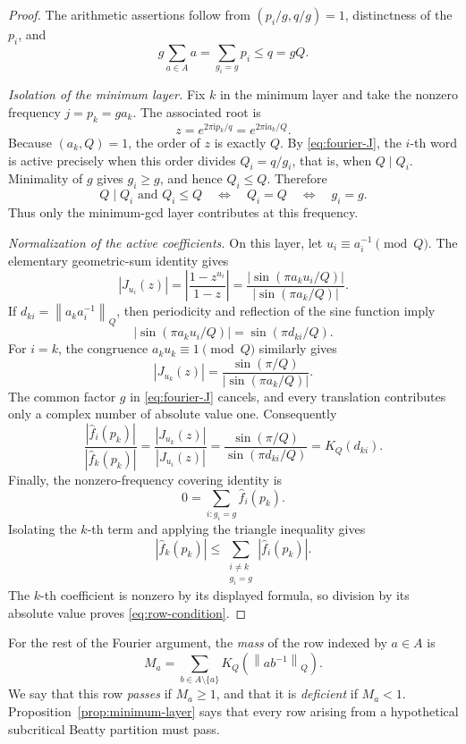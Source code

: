 \documentclass[11pt]{article}
\theoremstyle{definition}
\theoremstyle{remark}
\newcommand{\normQ}[1]{\left\lVert #1\right\rVert_Q}
\newcommand{\ii}{\mathrm i}
\begin{document}
\begin{proof}
The arithmetic assertions follow from
\((p_i/g,q/g)=1\), distinctness of the \(p_i\), and
\[
 g\sum_{a\in A}a=\sum_{g_i=g}p_i\le q=gQ.
\]

\smallskip
\noindent\emph{Isolation of the minimum layer.}
Fix \(k\) in the minimum layer and take the nonzero frequency
\(j=p_k=ga_k\).  The associated root is
\[
 z=e^{2\pi\ii p_k/q}=e^{2\pi\ii a_k/Q}.
\]
Because \((a_k,Q)=1\), the order of \(z\) is exactly \(Q\).  By
\eqref{eq:fourier-J}, the \(i\)-th word is active precisely when this order
divides \(Q_i=q/g_i\), that is, when \(Q\mid Q_i\).  Minimality of \(g\)
gives \(g_i\ge g\), and hence \(Q_i\le Q\).  Therefore
\[
 Q\mid Q_i\text{ and }Q_i\le Q
 \quad\Longleftrightarrow\quad Q_i=Q
 \quad\Longleftrightarrow\quad g_i=g.
\]
Thus only the minimum-gcd layer contributes at this frequency.

\smallskip
\noindent\emph{Normalization of the active coefficients.}
On this layer, let \(u_i\equiv a_i^{-1}\pmod Q\).  The elementary
geometric-sum identity gives
\[
|J_{u_i}(z)|
=\left|\frac{1-z^{u_i}}{1-z}\right|
=\frac{|\sin(\pi a_k u_i/Q)|}{|\sin(\pi a_k/Q)|}.
\]
If \(d_{ki}=\normQ{a_ka_i^{-1}}\), then periodicity and reflection of
the sine function imply
\[
 |\sin(\pi a_ku_i/Q)|=\sin(\pi d_{ki}/Q).
\]
For \(i=k\), the congruence \(a_ku_k\equiv1\pmod Q\) similarly gives
\[
 |J_{u_k}(z)|
 =\frac{\sin(\pi/Q)}{|\sin(\pi a_k/Q)|}.
\]
The common factor \(g\) in \eqref{eq:fourier-J} cancels, and every
translation contributes only a complex number of absolute value one.
Consequently
\[
 \frac{|\widehat f_i(p_k)|}{|\widehat f_k(p_k)|}
 =\frac{|J_{u_k}(z)|}{|J_{u_i}(z)|}
 =\frac{\sin(\pi/Q)}{\sin(\pi d_{ki}/Q)}
 =K_Q(d_{ki}).
\]
Finally, the nonzero-frequency covering identity is
\[
 0=\sum_{i:g_i=g}\widehat f_i(p_k).
\]
Isolating the \(k\)-th term and applying the triangle inequality gives
\[
 |\widehat f_k(p_k)|
 \le\sum_{\substack{i\ne k\\g_i=g}}|\widehat f_i(p_k)|.
\]
The \(k\)-th coefficient is nonzero by its displayed formula, so division
by its absolute value proves \eqref{eq:row-condition}.
\end{proof}

For the rest of the Fourier argument, the \emph{mass} of the row indexed by
\(a\in A\) is
\[
 M_a=\sum_{b\in A\setminus\{a\}}
 K_Q\!\left(\normQ{ab^{-1}}\right).
\]
We say that this row \emph{passes} if \(M_a\ge1\), and that it is
\emph{deficient} if \(M_a<1\).  Proposition~\ref{prop:minimum-layer}
says that every row arising from a hypothetical subcritical Beatty
partition must pass.
\end{document}
